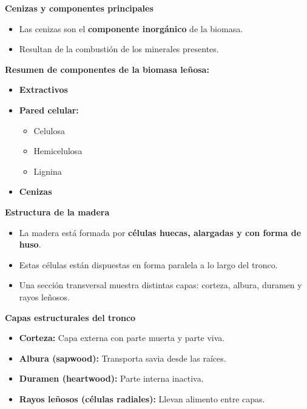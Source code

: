 \documentclass[../../main.tex]{subfiles}
\begin{document}
\begin{frame}{\textbf{Cenizas y componentes principales}}
\begin{itemize}
  \item Las cenizas son el \textbf{componente inorgánico} de la biomasa.
  \item Resultan de la combustión de los minerales presentes.
\end{itemize}

\vspace{1em}
\textbf{Resumen de componentes de la biomasa leñosa:}
\begin{itemize}
  \item \textbf{Extractivos}
  \item \textbf{Pared celular:}
    \begin{itemize}
      \item Celulosa
      \item Hemicelulosa
      \item Lignina
    \end{itemize}
  \item \textbf{Cenizas}
\end{itemize}
\end{frame}

\begin{frame}{\textbf{Estructura de la madera}}
\begin{itemize}
  \item La madera está formada por \textbf{células huecas, alargadas y con forma de huso}.
  \item Estas células están dispuestas en forma paralela a lo largo del tronco.
  \item Una sección transversal muestra distintas capas: corteza, albura, duramen y rayos leñosos.
\end{itemize}
{\textbf{Capas estructurales del tronco}}
\begin{itemize}
  \item \textbf{Corteza:} Capa externa con parte muerta y parte viva.
  \item \textbf{Albura (sapwood):} Transporta savia desde las raíces.
  \item \textbf{Duramen (heartwood):} Parte interna inactiva.
  \item \textbf{Rayos leñosos (células radiales):} Llevan alimento entre capas.
\end{itemize}
\end{frame}
\end{document}
